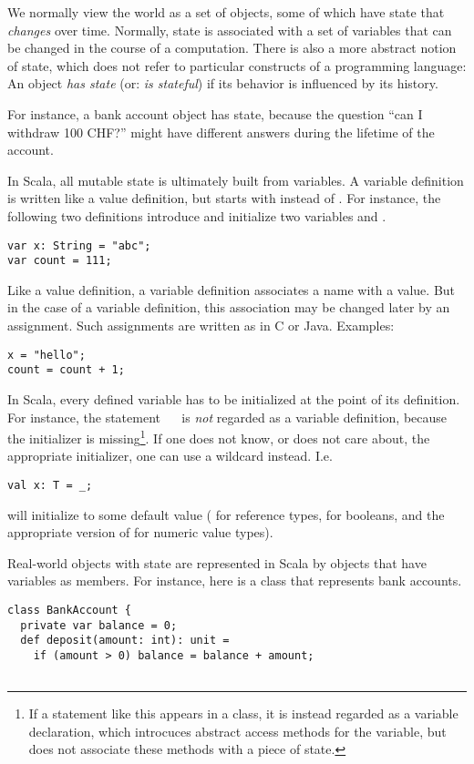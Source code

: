 {We normally view the world as a set of objects, some of which have
state that {\em changes} over time.  Normally, state is associated
with a set of variables that can be changed in the course of a
computation.  There is also a more abstract notion of state, which
does not refer to particular constructs of a programming language: An
object {\em has state} (or: {\em is stateful}) if its behavior is
influenced by its history.

For instance, a bank account object has state, because the question
``can I withdraw 100 CHF?''
might have different answers during the lifetime of the account.

In Scala, all mutable state is ultimately built from variables.  A
variable definition is written like a value definition, but starts
with \verb@var@ instead of \verb@val@. For instance, the following two
definitions introduce and initialize two variables  and
.
\begin{lstlisting}
var x: String = "abc";
var count = 111;
\end{lstlisting}
Like a value definition, a variable definition associates a name with
a value. But in the case of a variable definition, this association
may be changed later by an assignment.  Such assignments are written
as in C or Java. Examples:
\begin{lstlisting}
x = "hello";
count = count + 1;
\end{lstlisting}
In Scala, every defined variable has to be initialized at the point of
its definition. For instance, the statement ~~ is
{\em not} regarded as a variable definition, because the initializer
is missing\footnote{If a statement like this appears in a class, it is
instead regarded as a variable declaration, which introcuces
abstract access methods for the variable, but does not associate these
methods with a piece of state.}. If one does not know, or does not
care about, the appropriate initializer, one can use a wildcard
instead. I.e.
\begin{lstlisting}
val x: T = _;
\end{lstlisting}
will initialize  to some default value ( for
reference types,  for booleans, and the appropriate
version of  for numeric value types).

Real-world objects with state are represented in Scala by objects that
have variables as members. For instance, here is a class that
represents bank accounts.
\begin{lstlisting}
class BankAccount {
  private var balance = 0;
  def deposit(amount: int): unit =
    if (amount > 0) balance = balance + amount;


\end{lstlisting}}

